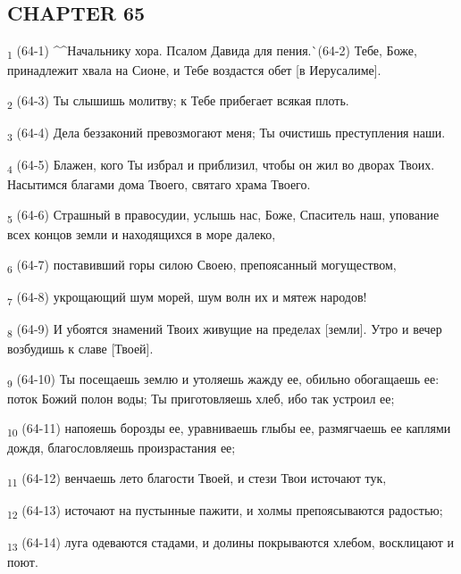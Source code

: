\subsection{CHAPTER 65}
\begin{tcolorbox}
\textsubscript{1} (64-1) ^^Начальнику хора. Псалом Давида для пения.^^ (64-2) Тебе, Боже, принадлежит хвала на Сионе, и Тебе воздастся обет [в Иерусалиме].
\end{tcolorbox}
\begin{tcolorbox}
\textsubscript{2} (64-3) Ты слышишь молитву; к Тебе прибегает всякая плоть.
\end{tcolorbox}
\begin{tcolorbox}
\textsubscript{3} (64-4) Дела беззаконий превозмогают меня; Ты очистишь преступления наши.
\end{tcolorbox}
\begin{tcolorbox}
\textsubscript{4} (64-5) Блажен, кого Ты избрал и приблизил, чтобы он жил во дворах Твоих. Насытимся благами дома Твоего, святаго храма Твоего.
\end{tcolorbox}
\begin{tcolorbox}
\textsubscript{5} (64-6) Страшный в правосудии, услышь нас, Боже, Спаситель наш, упование всех концов земли и находящихся в море далеко,
\end{tcolorbox}
\begin{tcolorbox}
\textsubscript{6} (64-7) поставивший горы силою Своею, препоясанный могуществом,
\end{tcolorbox}
\begin{tcolorbox}
\textsubscript{7} (64-8) укрощающий шум морей, шум волн их и мятеж народов!
\end{tcolorbox}
\begin{tcolorbox}
\textsubscript{8} (64-9) И убоятся знамений Твоих живущие на пределах [земли]. Утро и вечер возбудишь к славе [Твоей].
\end{tcolorbox}
\begin{tcolorbox}
\textsubscript{9} (64-10) Ты посещаешь землю и утоляешь жажду ее, обильно обогащаешь ее: поток Божий полон воды; Ты приготовляешь хлеб, ибо так устроил ее;
\end{tcolorbox}
\begin{tcolorbox}
\textsubscript{10} (64-11) напояешь борозды ее, уравниваешь глыбы ее, размягчаешь ее каплями дождя, благословляешь произрастания ее;
\end{tcolorbox}
\begin{tcolorbox}
\textsubscript{11} (64-12) венчаешь лето благости Твоей, и стези Твои источают тук,
\end{tcolorbox}
\begin{tcolorbox}
\textsubscript{12} (64-13) источают на пустынные пажити, и холмы препоясываются радостью;
\end{tcolorbox}
\begin{tcolorbox}
\textsubscript{13} (64-14) луга одеваются стадами, и долины покрываются хлебом, восклицают и поют.
\end{tcolorbox}
